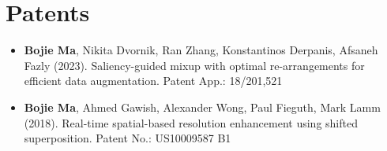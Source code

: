 \section*{Patents}
    \vspace{\postsubhead}
    \begin{adjustwidth}{\indentleft}{\indentright}
    \begin{itemize}
        \item \textbf{Bojie Ma}, Nikita Dvornik, Ran Zhang, Konstantinos Derpanis, Afsaneh Fazly (2023). Saliency-guided mixup with optimal re-arrangements for efficient data augmentation. Patent App.: 18/201,521
        \item \textbf{Bojie Ma}, Ahmed Gawish, Alexander Wong, Paul Fieguth, Mark Lamm (2018). Real-time spatial-based resolution enhancement using shifted superposition. Patent No.: US10009587 B1
      \end{itemize}
    \end{adjustwidth}
    \vspace{\postsection}